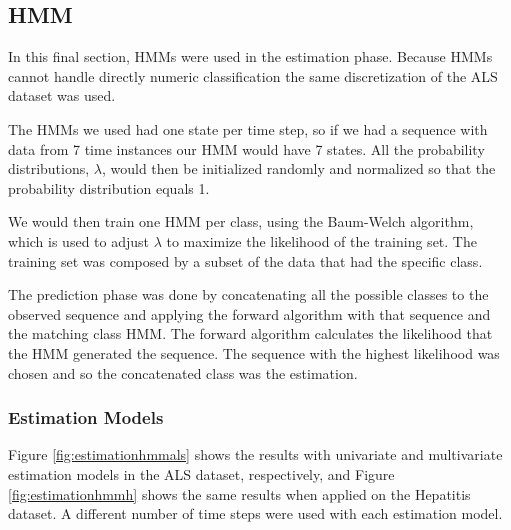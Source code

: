 \subsection{HMM}
\label{subsection:hmm}

In this final section, HMMs were used in the estimation phase. Because HMMs cannot handle directly numeric classification the same discretization of the ALS dataset was used.

The HMMs we used had one state per time step, so if we had a sequence with data from 7 time instances our HMM 
would have 7 states. All the probability distributions, $\lambda$, would then be initialized randomly and normalized 
so that the probability distribution equals 1.

We would then train one HMM per class, using the Baum-Welch algorithm, which is used to adjust $\lambda$ to maximize the 
likelihood of the training set. The training set was composed by a subset of the data that had the specific class. 

The prediction phase was done by concatenating all the possible classes to the observed sequence and applying the forward
 algorithm with that sequence and the matching class HMM. The forward algorithm calculates the likelihood that the HMM 
 generated the sequence. The sequence with the highest likelihood was chosen and so the concatenated class was the estimation.

\subsubsection{Estimation Models}
\label{subsubsection:estimation_hmm}


Figure \ref{fig:estimationhmmals} shows the results with univariate and multivariate estimation models in the ALS dataset,
 respectively, and Figure \ref{fig:estimationhmmh} shows the same results when applied on the Hepatitis dataset. A different number of time steps were used with each estimation model.

